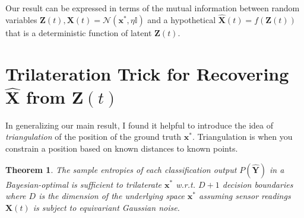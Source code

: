 \documentclass[12pt]{article}
\newtheorem{theorem}{Theorem}
\begin{document}
Our result can be expressed in terms of the mutual information between random variables $\mathbf Z(t), \mathbf X(t) = \mathcal N (\mathbf x^*, \eta \mathbb I)$ and a hypothetical $\hat{\mathbf X}(t) = f(\mathbf Z(t))$ that is a deterministic function of latent $\mathbf Z(t)$. 


\section{Trilateration Trick for Recovering $\hat{\mathbf X}$ from $\mathbf Z(t)$}
In generalizing our main result, I found it helpful to introduce the idea of \textit{triangulation} of the position of the ground truth $\mathbf x^*$. 
Triangulation is when you constrain a position based on known distances to known points. 

\begin{theorem}
	\label{thm:trilateration}
	The sample entropies of each classification output $P(\hat{\mathbf Y})$ in a Bayesian-optimal is sufficient to trilaterate $\mathbf x^*$ w.r.t. $D+1$ decision boundaries where $D$ is the dimension of the underlying space $\mathbf x^*$ assuming sensor readings $\mathbf X(t)$ is subject to equivariant Gaussian noise.
\end{theorem}
\end{document}
